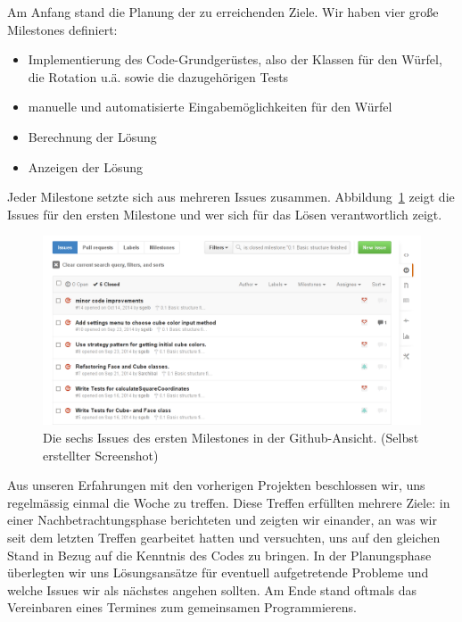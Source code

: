 Am Anfang stand die Planung der zu erreichenden Ziele. Wir haben vier große
Milestones definiert:

\begin{itemize}

  \item Implementierung des Code-Grundgerüstes, also der Klassen für den Würfel,
    die Rotation u.ä. sowie die dazugehörigen Tests
  \item manuelle und automatisierte Eingabemöglichkeiten für den Würfel
  \item Berechnung der Lösung
  \item Anzeigen der Lösung
\end{itemize}

Jeder Milestone setzte sich aus mehreren Issues zusammen.
Abbildung~\ref{fig:github_issues} zeigt die Issues für den ersten Milestone und
wer sich für das Lösen verantwortlich zeigt.

\begin{figure}[ht!]
  \centering
  \includegraphics[width=\textwidth]{pics/github_issues.png}
  \caption{Die sechs Issues des ersten Milestones in der Github-Ansicht.
  (Selbst erstellter Screenshot)}
  \label{fig:github_issues}
\end{figure}

Aus unseren Erfahrungen mit den vorherigen Projekten beschlossen wir, uns
regelmässig einmal die Woche zu treffen. Diese Treffen erfüllten mehrere Ziele:
in einer Nachbetrachtungsphase berichteten und zeigten wir einander, an was wir
seit dem letzten Treffen gearbeitet hatten und versuchten, uns auf den gleichen
Stand in Bezug auf die Kenntnis des Codes zu bringen. In der Planungsphase
überlegten wir uns Lösungsansätze für eventuell aufgetretende Probleme und
welche Issues wir als nächstes angehen sollten. Am Ende stand oftmals das
Vereinbaren eines Termines zum gemeinsamen Programmierens.


